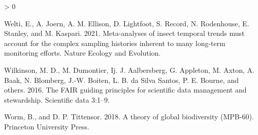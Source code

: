 \documentclass[
  12pt,
]{article}
\newlength{\cslhangindent}
\newenvironment{CSLReferences}[2] %
 {%
  \setlength{\parindent}{0pt}
  \ifodd #1 \everypar{\setlength{\hangindent}{\cslhangindent}}\ignorespaces\fi
  \ifnum #2 > 0
  \setlength{\parskip}{#2\baselineskip}
  \fi
 }%
 {}
\begin{document}
\begin{CSLReferences}{1}{0}
\leavevmode\hypertarget{ref-welti2021meta}{}%
Welti, E., A. Joern, A. M. Ellison, D. Lightfoot, S. Record, N. Rodenhouse, E. Stanley, and M. Kaspari. 2021. Meta-analyses of insect temporal trends must account for the complex sampling histories inherent to many long-term monitoring efforts. Nature Ecology and Evolution.

\leavevmode\hypertarget{ref-wilkinson2016fair}{}%
Wilkinson, M. D., M. Dumontier, Ij. J. Aalbersberg, G. Appleton, M. Axton, A. Baak, N. Blomberg, J.-W. Boiten, L. B. da Silva Santos, P. E. Bourne, and others. 2016. The FAIR guiding principles for scientific data management and stewardship. Scientific data 3:1--9.

\leavevmode\hypertarget{ref-worm2018theory}{}%
Worm, B., and D. P. Tittensor. 2018. A theory of global biodiversity (MPB-60). Princeton University Press.

\end{CSLReferences}
\end{document}
